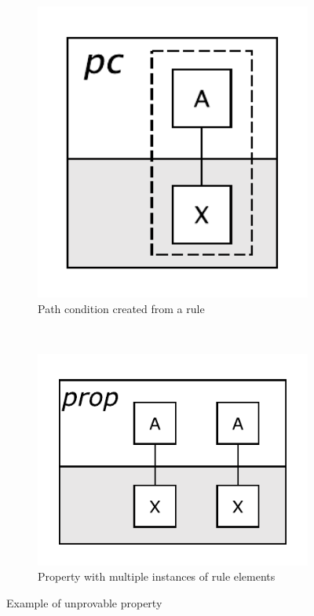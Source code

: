 \begin{figure}[htb]
        \centering
        \begin{subfigure}[b]{0.144\textwidth}
                \centering
                \includegraphics[width=1\textwidth]{./figures/property_proving/unprovable_rule.pdf}
                \caption{Path condition created from a rule}
                \label{fig:unprovable_pc}
        \end{subfigure}%
        ~~
        \begin{subfigure}[b]{0.20\textwidth}
                \centering
                \includegraphics[width=1\textwidth]{./figures/property_proving/unprovable_prop.pdf}
                \caption{Property with multiple instances of rule elements}
                \label{fig:unprovable_prop}
        \end{subfigure}%
        \caption{Example of unprovable property}
        \label{fig:unprovable_property}
\end{figure}

